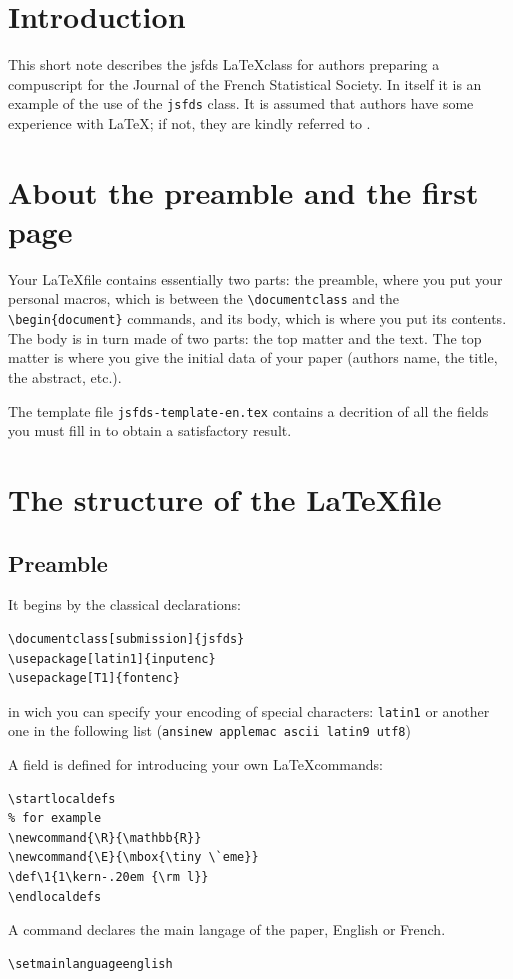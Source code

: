 \documentclass[submission]{jsfds}
\begin{document}
\section{Introduction}
This short note describes the jsfds \LaTeX class for authors preparing a compuscript for the Journal of the French Statistical Society. In itself it is an example of the use of the \texttt{jsfds} class. It is assumed that authors have some experience with \LaTeX; if not, they are kindly referred to \cite{lam94}.

\section{About the preamble and the first page}
Your \LaTeX file contains essentially two parts: the preamble, where you put your personal macros, which is between the \verb+\documentclass+ and the \verb+\begin{document}+ commands, and its body, which is where you put its contents. The body is in turn made of two parts: the top matter and the text. The top matter is where you give the initial data of your paper (authors name, the title, the abstract, etc.).

The template file \verb+jsfds-template-en.tex+ contains a decrition of all the fields you must fill in to obtain a satisfactory result. 

\section{The structure of the \LaTeX file}
\subsection{Preamble}
It begins by the classical declarations:
\begin{verbatim}
\documentclass[submission]{jsfds}
\usepackage[latin1]{inputenc}
\usepackage[T1]{fontenc}
\end{verbatim}
in wich you can specify your encoding of special characters: \verb+latin1+ or another one in the following list (\verb+ansinew applemac ascii latin9 utf8+)

A field is defined for introducing your own \LaTeX \;commands:
\begin{verbatim}
\startlocaldefs
% for example
\newcommand{\R}{\mathbb{R}}
\newcommand{\E}{\mbox{\tiny \`eme}}
\def\1{1\kern-.20em {\rm l}}
\endlocaldefs
\end{verbatim}
A command declares the main langage of the paper, English or French.
\begin{verbatim}
\setmainlanguageenglish
\end{verbatim}
\end{document}
